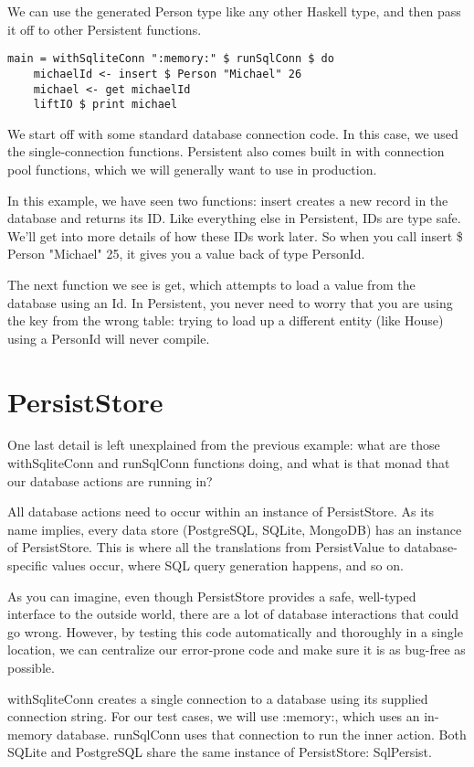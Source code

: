 We can use the generated Person type like any other Haskell type, and then pass it off to other Persistent functions.

\begin{lstlisting}
main = withSqliteConn ":memory:" $ runSqlConn $ do
    michaelId <- insert $ Person "Michael" 26
    michael <- get michaelId
    liftIO $ print michael
\end{lstlisting}

We start off with some standard database connection code. In this case, we used the single-connection functions. Persistent also comes built in with connection pool functions, which we will generally want to use in production.

In this example, we have seen two functions: insert creates a new record in the database and returns its ID. Like everything else in Persistent, IDs are type safe. We'll get into more details of how these IDs work later. So when you call insert \$ Person "Michael" 25, it gives you a value back of type PersonId.

The next function we see is get, which attempts to load a value from the database using an Id. In Persistent, you never need to worry that you are using the key from the wrong table: trying to load up a different entity (like House) using a PersonId will never compile.

\section{PersistStore}

One last detail is left unexplained from the previous example: what are those withSqliteConn and runSqlConn functions doing, and what is that monad that our database actions are running in?

All database actions need to occur within an instance of PersistStore. As its name implies, every data store (PostgreSQL, SQLite, MongoDB) has an instance of PersistStore. This is where all the translations from PersistValue to database-specific values occur, where SQL query generation happens, and so on.

As you can imagine, even though PersistStore provides a safe, well-typed interface to the outside world, there are a lot of database interactions that could go wrong. However, by testing this code automatically and thoroughly in a single location, we can centralize our error-prone code and make sure it is as bug-free as possible.

withSqliteConn creates a single connection to a database using its supplied connection string. For our test cases, we will use :memory:, which uses an in-memory database. runSqlConn uses that connection to run the inner action. Both SQLite and PostgreSQL share the same instance of PersistStore: SqlPersist.

